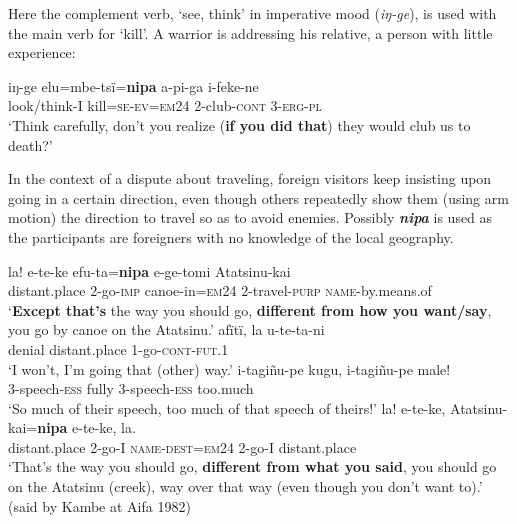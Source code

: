 \documentclass[output=paper]{langsci/langscibook}
\begin{document}
Here the complement verb, ‘see, think’ in imperative mood (\textit{iŋ-ge}), is used with the main  verb for ‘kill’.  A warrior is addressing his relative, a person with little experience:

\begin{exe}
	\ex \label{ex:eb60}
	\gll iŋ-ge elu=mbe-tsï=\textbf{nipa} a-pi-ga i-feke-ne\\
	look/think-I kill=\textsc{se-ev=em24} 2-club-\textsc{cont} 3-\textsc{erg-pl}\\
	\trans ‘Think carefully, don’t you realize (\textbf{if you did that}) they would club us to death?’
\end{exe}

In the context of a dispute about traveling, foreign visitors keep insisting upon going in a certain direction, even though others repeatedly show them (using arm motion)  the direction to travel so as to avoid enemies. Possibly \textbf{\textit{nipa}} is used as the participants are foreigners with no knowledge of the local geography. 

\begin{exe}
\ex \label{ex:eb61}
	\begin{xlist}
	\ex 
	\gll la! e-te-ke efu-ta=\textbf{nipa} e-ge-tomi Atatsinu-kai\\
	distant.place 2-go-\textsc{imp} canoe-in=\textsc{em24} 2-travel-\textsc{purp} \textsc{name}-by.means.of\\
	\trans `\textbf{Except that’s} the way you should go, \textbf{different from how you want/say}, you go by canoe on the Atatsinu.'
	\ex 
	\gll afïtï, la u-te-ta-ni\\
	denial distant.place 1-go-\textsc{cont-fut.1}\\
	\trans ‘I won’t, I’m going that (other) way.’
	\ex
	\gll i-tagiñu-pe kugu, i-tagiñu-pe male!\\
	3-speech-\textsc{ess} fully 3-speech-\textsc{ess} too.much\\
	\trans ‘So much of their speech,  too much of that speech of theirs!'
	\ex
	\gll la! e-te-ke, Atatsinu-kai=\textbf{nipa} e-te-ke, la.\\
	distant.place 2-go-I \textsc{name}-\textsc{dest=em24} 2-go-I distant.place\\
	\trans ‘That’s the way you should go, \textbf{different from what you said},  you should go on the Atatsinu (creek),   way over that way (even though you don’t want to).’ (said by Kambe at Aifa 1982)
\end{xlist}
\end{exe}
\end{document}

